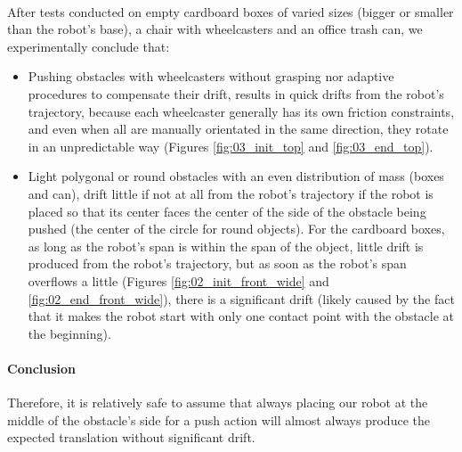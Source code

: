 \paragraph{} After tests conducted on empty cardboard boxes of varied sizes (bigger or smaller than the robot's base), a chair with wheelcasters and an office trash can, we experimentally conclude that:
\begin{itemize}
  \item Pushing obstacles with wheelcasters without grasping nor adaptive procedures to compensate their drift, results in quick drifts from the robot's trajectory, because each wheelcaster generally has its own friction constraints, and even when all are manually orientated in the same direction, they rotate in an unpredictable way (Figures \ref{fig:03_init_top} and \ref{fig:03_end_top}).
  \item Light polygonal or round obstacles with an even distribution of mass (boxes and can), drift little if not at all from the robot's trajectory if the robot is placed so that its center faces the center of the side of the obstacle being pushed (the center of the circle for round objects). For the cardboard boxes, as long as the robot's span is within the span of the object, little drift is produced from the robot's trajectory, but as soon as the robot's span overflows a little (Figures \ref{fig:02_init_front_wide} and \ref{fig:02_end_front_wide}), there is a significant drift (likely caused by the fact that it makes the robot start with only one contact point with the obstacle at the beginning).
\end{itemize}

\paragraph{Conclusion} Therefore, it is relatively safe to assume that always placing our robot at the middle of the obstacle's side for a push action will almost always produce the expected translation without significant drift.

